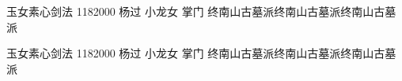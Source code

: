 \documentclass[print, doctor, vlined]{DissertUESTC}
\begin{document}
	
	\newcommand{\shad}[1]{\textcolor{DodgerBlue}{\ttfamily #1}}
	\newcommand{\shadcmd}[1]{\shad{$\backslash$#1}}

	

	\uestccover{}{}{}{}{}{}{}  %

				{玉女素心剑法}
				{1182000}
				{杨\hspace{1em}过}
				{小龙女}
				{掌\hspace{1em}门}%
				{终南山古墓派终南山古墓派终南山古墓派}  %

				{玉女素心剑法}
				{1182000}
				{杨\hspace{1em}过}
				{小龙女}
				{掌\hspace{1em}门}%
				{终南山古墓派终南山古墓派终南山古墓派}  %

				
\end{document}

